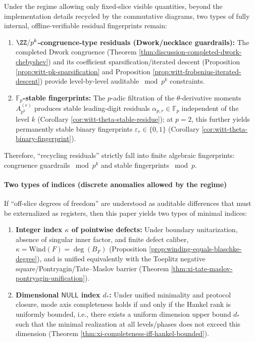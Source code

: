 \begin{corollary}\label{cor:discussion-recycling-residuals}
Under the regime allowing only fixed-slice visible quantities, beyond the implementation details recycled by the commutative diagrams, two types of fully internal, offline-verifiable residual fingerprints remain:
\begin{enumerate}
  \item \textbf{\(\ZZ/p^k\)-congruence-type residuals (Dwork/necklace guardrails):}
  The completed Dwork congruence (Theorem \ref{thm:discussion-completed-dwork-chebyshev}) and its coefficient sparsification/iterated descent (Proposition \ref{prop:witt-pk-sparsification} and Proposition \ref{prop:witt-frobenius-iterated-descent}) provide level-by-level auditable \(\bmod p^k\) constraints.
  \item \textbf{\(\mathbb{F}_p\)-stable fingerprints:}
  The \(p\)-adic filtration of the \(\theta\)-derivative moments \(A^{(r)}_{p^k}\) produces stable leading-digit residuals \(\alpha_{p,r}\in\mathbb{F}_p\) independent of the level \(k\) (Corollary \ref{cor:witt-theta-stable-residue}); at \(p=2\), this further yields permanently stable binary fingerprints \(\varepsilon_r\in\{0,1\}\) (Corollary \ref{cor:witt-theta-binary-fingerprint}).
\end{enumerate}
Therefore, ``recycling residuals'' strictly fall into finite algebraic fingerprints: congruence guardrails \(\bmod p^k\) and stable fingerprints \(\bmod p\).
\end{corollary}

\paragraph{Two types of indices (discrete anomalies allowed by the regime)}
If ``off-slice degrees of freedom'' are understood as auditable differences that must be externalized as registers, then this paper yields two types of minimal indices:
\begin{enumerate}
  \item \textbf{Integer index \(\kappa\) of pointwise defects:}
  Under boundary unitarization, absence of singular inner factor, and finite defect caliber,
  \(\kappa=\mathrm{Wind}(F)=\deg(B_F)\)
  (Proposition \ref{prop:winding-equals-blaschke-degree}), and is unified equivalently with the Toeplitz negative square/Pontryagin/Tate--Maslov barrier (Theorem \ref{thm:xi-tate-maslov-pontryagin-unification}).
  \item \textbf{Dimensional \(\mathsf{NULL}\) index \(d_\ast\):}
  Under unified minimality and protocol closure, mode axis completeness holds if and only if the Hankel rank is uniformly bounded, i.e., there exists a uniform dimension upper bound \(d_\ast\) such that the minimal realization at all levels/phases does not exceed this dimension (Theorem \ref{thm:xi-completeness-iff-hankel-bounded}).
\end{enumerate}

